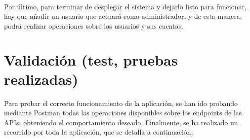 \documentclass[a4paper]{article}
\begin{document}
\paragraph{}Por último, para terminar de desplegar el sistema y dejarlo listo para funcionar, hay que añadir un usuario que actuará como administrador, y de esta manera, podrá realizar operaciones sobre los usuarios y sus cuentas.

\section{Validación (test, pruebas realizadas)}
\paragraph{}Para probar el correcto funcionamiento de la aplicación, se han ido probando mediante Postman todas las operaciones disponibles sobre los endpoints de las APIs, obteniendo el comportamiento deseado. Finalmente, se ha realizado un recorrido por toda la aplicación, que se detalla a continuación:
\end{document}
